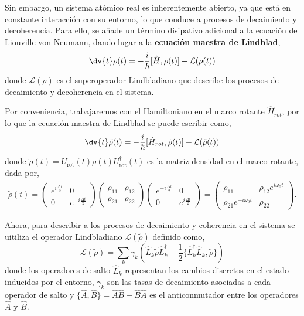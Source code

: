 Sin embargo, un sistema atómico real es inherentemente abierto, ya que está en constante interacción con su entorno, lo que conduce a procesos de decaimiento y decoherencia. Para ello, se añade un término disipativo adicional a la ecuación de Liouville-von Neumann, dando lugar a la \textbf{ecuación maestra de Lindblad},
\begin{equation}
    \dv{t} \rho(t) = -\frac{i}{\hbar} [\hat{H}, \rho(t)] + \mathcal{L}(\rho(t))
\end{equation}
donde $\mathcal{L}(\rho)$ es el superoperador Lindbladiano que describe los procesos de decaimiento y decoherencia en el sistema.

Por conveniencia, trabajaremos con el Hamiltoniano en el marco rotante $\hat{H}_{rot}$, por lo que la ecuación maestra de Lindblad se puede escribir como,
\begin{equation}
    \dv{t} \tilde{\rho}(t) = -\frac{i}{\hbar} [\hat{H}_{rot}, \tilde{\rho}(t)] + \mathcal{L}(\tilde{\rho}(t))
\end{equation}
donde $\tilde{\rho}(t) = U_{\text{rot}}(t) \rho(t) U_{\text{rot}}^{\dagger}(t)$ es la matriz densidad en el marco rotante, dada por,
\begin{equation}
\begin{split}
    \tilde{\rho}(t) = \begin{pmatrix}
    e^{i \frac{\Delta t}{2}} & 0 \\
    0 & e^{-i \frac{\Delta t}{2}}
    \end{pmatrix} \begin{pmatrix}
    \rho_{11} & \rho_{12} \\
    \rho_{21} & \rho_{22}
    \end{pmatrix}\begin{pmatrix}
    e^{-i \frac{\Delta t}{2}} & 0 \\
    0 & e^{i \frac{\Delta t}{2}}
    \end{pmatrix} =\begin{pmatrix}
        \rho_{11} & \rho_{12}e^{i \omega_0 t} \\
        \rho_{21}e^{-i \omega_0 t} & \rho_{22}
    \end{pmatrix}.
\end{split}
\end{equation}    

Ahora, para describir a los procesos de decaimiento y coherencia en el sistema se uitiliza el operador Lindbladiano $\mathcal{L}(\tilde{\rho})$ definido como,
\begin{equation}
    \mathcal{L}(\tilde{\rho}) = \sum_k \gamma_k \left( \hat{L}_k \tilde{\rho} \hat{L}_k^{\dagger} - \frac{1}{2} \{\hat{L}_k^{\dagger} \hat{L}_k, \tilde{\rho}\} \right)
\end{equation}
donde los operadores de salto $\hat{L}_k$ representan los cambios discretos en el estado inducidos por el entorno, $\gamma_k$ son las tasas de decaimiento asociadas a cada operador de salto y $\{ \hat{A}, \hat{B} \} = \hat{A} \hat{B} + \hat{B} \hat{A}$ es el anticonmutador entre los operadores $\hat{A}$ y $\hat{B}$.

